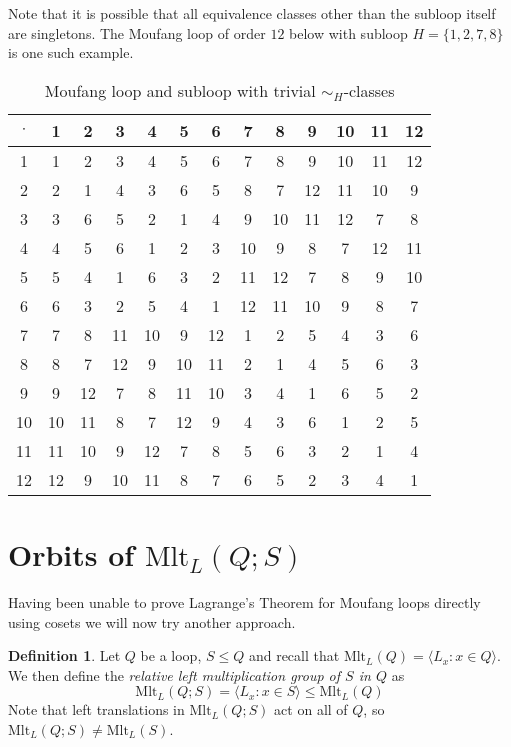 \documentclass[12pt, twoside, openright]{report}
\theoremstyle{definition}
\newtheorem{dfn}[thm]{Definition}
\newcommand{\mlt}{\text{Mlt}}       %
\begin{document}
Note that it is possible that all equivalence classes other than the subloop itself are singletons.
  The Moufang loop of order $12$ below with subloop $H = \{1, 2, 7, 8\}$ is one such example.

\begin{table}[H]
  \centering
  \begin{tabular}{c | c c c c c c c c c c c c}
    $\cdot$ & 1 & 2 & 3 & 4 & 5 & 6 & 7 & 8 & 9 & 10 & 11 & 12\\
    \hline \hline
    1 & 1 & 2 & 3 & 4 & 5 & 6 & 7 & 8 & 9 & 10 & 11 & 12 \\
    2 & 2 & 1 & 4 & 3 & 6 & 5 & 8 & 7 & 12 & 11 & 10 & 9 \\
    3 & 3 & 6 & 5 & 2 & 1 & 4 & 9 & 10 & 11 & 12 & 7 & 8 \\
    4 & 4 & 5 & 6 & 1 & 2 & 3 & 10 & 9 & 8 & 7 & 12 & 11 \\
    5 & 5 & 4 & 1 & 6 & 3 & 2 & 11 & 12 & 7 & 8 & 9 & 10 \\
    6 & 6 & 3 & 2 & 5 & 4 & 1 & 12 & 11 & 10 & 9 & 8 & 7 \\
    7 & 7 & 8 & 11 & 10 & 9 & 12 & 1 & 2 & 5 & 4 & 3 & 6 \\
    8 & 8 & 7 & 12 & 9 & 10 & 11 & 2 & 1 & 4 & 5 & 6 & 3 \\
    9 & 9 & 12 & 7 & 8 & 11 & 10 & 3 & 4 & 1 & 6 & 5 & 2 \\
    10 & 10 & 11 & 8 & 7 & 12 & 9 & 4 & 3 & 6 & 1 & 2 & 5 \\
    11 & 11 & 10 & 9 & 12 & 7 & 8 & 5 & 6 & 3 & 2 & 1 & 4 \\
    12 & 12 & 9 & 10 & 11 & 8 & 7 & 6 & 5 & 2 & 3 & 4 & 1
  \end{tabular}
  \caption{Moufang loop and subloop with trivial $\sim_H$-classes}
\end{table}


\section{Orbits of $\mlt_L(Q; S)$}

Having been unable to prove Lagrange's Theorem for Moufang loops directly using cosets we will
  now try another approach.

\begin{dfn}
  Let $Q$ be a loop, $S\leq Q$ and recall that $\mlt_L(Q) = \langle L_x : x\in Q\rangle$. We
    then define the \emph{relative left multiplication group of $S$ in $Q$} as 
  \[\mlt_L(Q; S) = \langle L_x : x\in S\rangle \leq \mlt_L(Q)\]
  Note that left translations in $\mlt_L(Q; S)$ act on all of $Q$, so $\mlt_L(Q; S)\neq \mlt_L(S)$.
\end{dfn}
\end{document}
